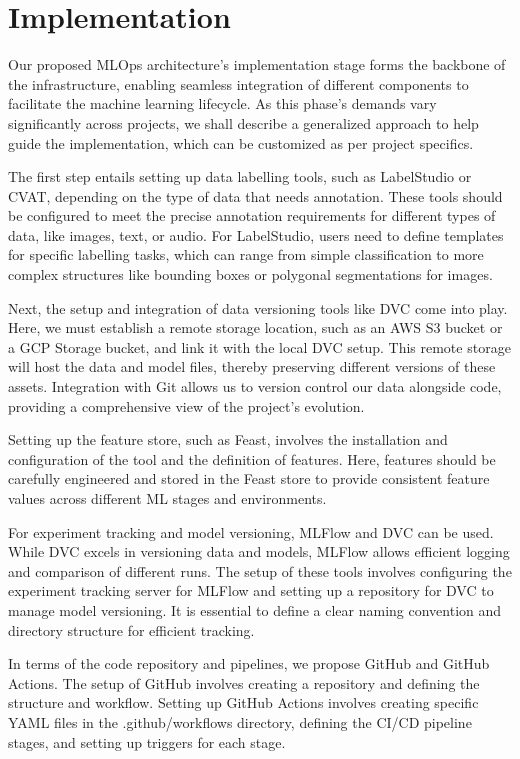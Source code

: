 \section{Implementation \label{implementation}}
Our proposed MLOps architecture's implementation stage forms the backbone of the infrastructure, enabling seamless integration of different components to facilitate the machine learning lifecycle. As this phase's demands vary significantly across projects, we shall describe a generalized approach to help guide the implementation, which can be customized as per project specifics.

The first step entails setting up data labelling tools, such as LabelStudio or CVAT, depending on the type of data that needs annotation. These tools should be configured to meet the precise annotation requirements for different types of data, like images, text, or audio. For LabelStudio, users need to define templates for specific labelling tasks, which can range from simple classification to more complex structures like bounding boxes or polygonal segmentations for images.

Next, the setup and integration of data versioning tools like DVC come into play. Here, we must establish a remote storage location, such as an AWS S3 bucket or a GCP Storage bucket, and link it with the local DVC setup. This remote storage will host the data and model files, thereby preserving different versions of these assets. Integration with Git allows us to version control our data alongside code, providing a comprehensive view of the project's evolution.

Setting up the feature store, such as Feast, involves the installation and configuration of the tool and the definition of features. Here, features should be carefully engineered and stored in the Feast store to provide consistent feature values across different ML stages and environments.

For experiment tracking and model versioning, MLFlow and DVC can be used. While DVC excels in versioning data and models, MLFlow allows efficient logging and comparison of different runs. The setup of these tools involves configuring the experiment tracking server for MLFlow and setting up a repository for DVC to manage model versioning. It is essential to define a clear naming convention and directory structure for efficient tracking.

In terms of the code repository and pipelines, we propose GitHub and GitHub Actions. The setup of GitHub involves creating a repository and defining the structure and workflow. Setting up GitHub Actions involves creating specific YAML files in the .github/workflows directory, defining the CI/CD pipeline stages, and setting up triggers for each stage.

